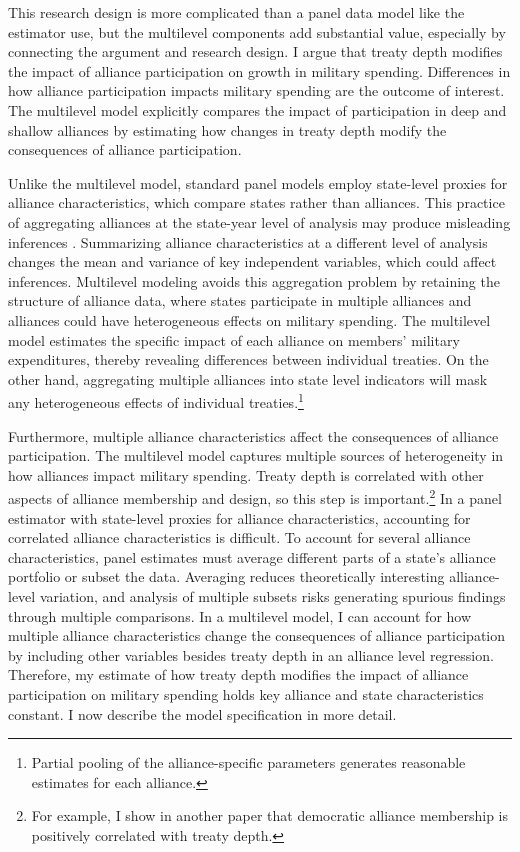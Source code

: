 \documentclass[12pt]{article}
\begin{document}
This research design is more complicated than a panel data model like the estimator \citet{DigiuseppePoast2016} use, but the multilevel components add substantial value, especially by connecting the argument and research design.
I argue that treaty depth modifies the impact of alliance participation on growth in military spending. 
Differences in how alliance participation impacts military spending are the outcome of interest.  
The multilevel model explicitly compares the impact of participation in deep and shallow alliances by estimating how changes in treaty depth modify the consequences of alliance participation. 


Unlike the multilevel model, standard panel models employ state-level proxies for alliance characteristics, which compare states rather than alliances.
This practice of aggregating alliances at the state-year level of analysis may produce misleading inferences \citep[pg. 356]{McElreath2016}.
Summarizing alliance characteristics at a different level of analysis changes the mean and variance of key independent variables, which could affect inferences. 
Multilevel modeling avoids this aggregation problem by retaining the structure of alliance data, where states participate in multiple alliances and alliances could have heterogeneous effects on military spending.
The multilevel model estimates the specific impact of each alliance on members' military expenditures, thereby revealing differences between individual treaties. 
On the other hand, aggregating multiple alliances into state level indicators will mask any heterogeneous effects of individual treaties.\footnote{Partial pooling of the alliance-specific parameters generates reasonable estimates for each alliance.} 


Furthermore, multiple alliance characteristics affect the consequences of alliance participation.
The multilevel model captures multiple sources of heterogeneity in how alliances impact military spending. 
Treaty depth is correlated with other aspects of alliance membership and design, so this step is important.\footnote{For example, I show in another paper that democratic alliance membership is positively correlated with treaty depth.}
In a panel estimator with state-level proxies for alliance characteristics, accounting for correlated alliance characteristics is difficult. 
To account for several alliance characteristics, panel estimates must average different parts of a state's alliance portfolio or subset the data.
Averaging reduces theoretically interesting alliance-level variation, and analysis of multiple subsets risks generating spurious findings through multiple comparisons.  
In a multilevel model, I can account for how multiple alliance characteristics change the consequences of alliance participation by including other variables besides treaty depth in an alliance level regression. 
Therefore, my estimate of how treaty depth modifies the impact of alliance participation on military spending holds key alliance and state characteristics constant. 
I now describe the model specification in more detail. 
 
\end{document}
